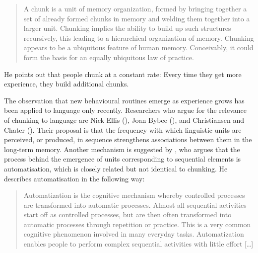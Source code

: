 \begin{quote}
A chunk is a unit of memory organization, formed by bringing together a set of already formed chunks in memory and welding them together into a larger unit. Chunking implies the ability to build up such structures recursively, this leading to a hierarchical organization of memory. Chunking appears to be a ubiquitous feature of human memory. Conceivably, it could form the basis for an equally ubiquitous law of practice. \citep[][7]{newell-1990}
\end{quote}
He points out that people chunk at a constant rate: Every time they get more experience, they build additional chunks. 

The observation that new behavioural routines emerge as experience grows has been applied to language only recently. Researchers who argue for the relevance of chunking to language are Nick Ellis (\citeyear{ellis-1996}), Joan Bybee (\citeyear{bybee-constituency-2002}), and Christiansen and Chater (\citeyear{christiansen-chater-2016}). Their proposal is that the frequency with which linguistic units are perceived, or produced, in sequence strengthens associations between them in the long-term memory. Another mechanism is suggested by \citet{diessel-toappear}, who argues that the process behind the emergence of units corresponding to sequential elements is automatisation, which is closely related but not identical to chunking. He describes automatisation in the following way: 

\begin{quote}
Automatization is the cognitive mechanism whereby controlled processes are transformed into automatic processes. Almost all sequential activities start off as controlled processes, but are then often transformed into automatic processes through repetition or practice. This is a very common cognitive phenomenon involved in many everyday tasks. Automatization enables people to perform complex sequential activities with little effort [\dots] \citep[][19]{diessel-toappear}
\end{quote}

